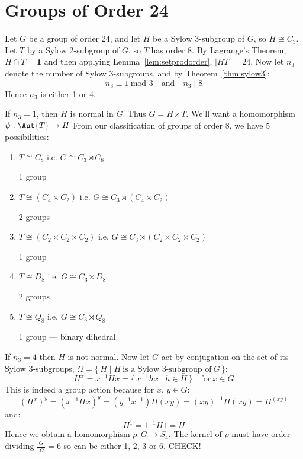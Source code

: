 \section{Groups of Order 24}
Let \(G\) be a group of order 24, and let \(H\) be a Sylow 3-subgroup of \(G\), so \(H \cong C_3\).
Let \(T\) by a Sylow 2-subgroup of \(G\), so \(T\) has order 8.
By Lagrange's Theorem, \(H \cap T = \bm{1}\) and then applying Lemma~\ref{lem:setprodorder}, \(|HT| = 24\).
Now let \(n_3\) denote the number of Sylow 3-subgroups, and by Theorem~\ref{thm:sylow3}:
\[n_3 \equiv 1\ \text{mod 3} \quad \text{and} \quad n_3 \mid 8\]
Hence \(n_3\) is either 1 or 4.

If \(n_3 = 1\), then \(H\) is normal in \(G\).
Thus \(G = H \rtimes T\).
We'll want a homomorphism \(\psi: \Aut{T} \to H\)
From our classification of groups of order 8, we have 5 possibilities:

\begin{enumerate}
    \item \(T \cong C_8\) i.e. \(G \cong C_3 \rtimes C_8\)
        
        1 group
    \item \(T \cong (C_4 \times C_2)\) i.e. \(G \cong C_3 \rtimes (C_4 \times C_2)\)
    
        2 groups
    \item \(T \cong (C_2 \times C_2 \times C_2)\) i.e. \(G \cong C_3 \rtimes (C_2 \times C_2 \times C_2)\)

        1 group
    \item \(T \cong D_8\) i.e. \(G \cong C_3 \rtimes D_8\)
        
        2 groups
    \item \(T \cong Q_8\) i.e. \(G \cong C_3 \rtimes Q_8\)

        1 group --- binary dihedral
\end{enumerate}

If \(n_3 = 4\) then \(H\) is not normal.
Now let \(G\) act by conjugation on the set of its Sylow 3-subgroups, \(\Omega = \{\,H \mid H\ \text{is a Sylow
3-subgroup of}\ G\,\}\):
\[H^x = x^{-1}Hx = \{\,x^{-1}hx \mid h \in H\,\} \quad \text{for}\ x \in G\]
This is indeed a group action because for \(x,\,y \in G\):
\[{(H^x)}^y = {(x^{-1}Hx)}^y = (y^{-1}x^{-1})H(xy) = {(xy)}^{-1}H(xy) = H^{(xy)}\]
and:
\[H^1 = 1^{-1}H1 = H\]
Hence we obtain a homomorphism \(\rho:G \to S_4\).
The kernel of \(\rho\) must have order dividing \(\frac{|G|}{|\Omega|} = 6\) so can be either 1, 2, 3 or 6.
{CHECK!\itshape\/}

